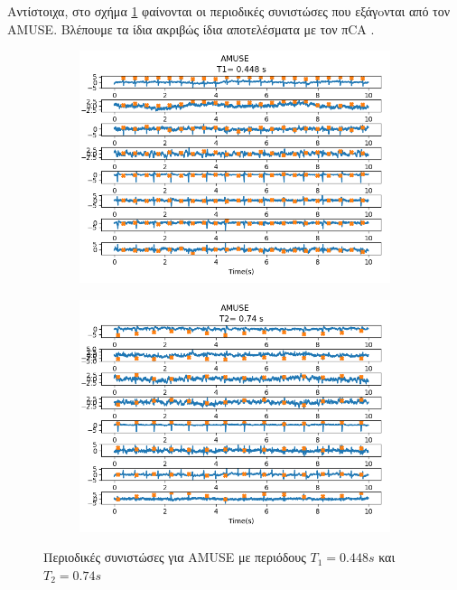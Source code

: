 \noindent Αντίστοιχα, στο σχήμα \ref{fig:5.33} φαίνονται οι περιοδικές συνιστώσες που εξάγoνται από τον \en AMUSE. \gr Βλέπουμε τα ίδια ακριβώς ίδια αποτελέσματα με τον π\en CA \gr. 
\begin{figure}[H] 
    \centering
    \begin{subfigure}{0.48 \textwidth}
        \centering
        \includegraphics[width=\textwidth]{daisy/amuse_infant.png}\en
    \end{subfigure}
    \hfill
    \begin{subfigure}{0.48 \textwidth}
        \centering
        \includegraphics[width=\textwidth]{daisy/amuse_maternal.png}
        \en
    \end{subfigure}
    \gr
    \caption{Περιοδικές συνιστώσες για \en AMUSE \gr με περιόδους \en $Τ_1 = 0.448 s$ \gr και \en $Τ_2 = 0.74 s$ \gr  }
    \label{fig:5.33}
\end{figure} 
